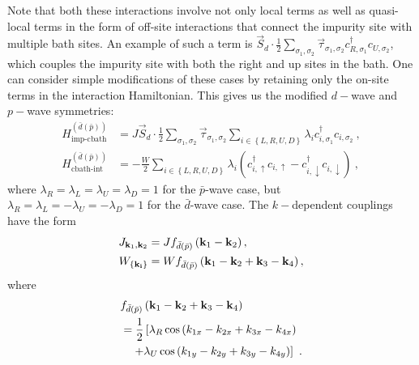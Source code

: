 \documentclass[reprint,hidelinks,onecolumn]{revtex4-2}
\begin{document}
Note that both these interactions involve not only local terms as well as quasi-local terms in the form of off-site interactions that connect the impurity site with multiple bath sites. An example of such a term is \(\vec{S}_d\cdot\frac{1}{2}\sum_{\sigma_1,\sigma_2}\vec{\tau}_{\sigma_1,\sigma_2} c^\dagger_{R,\sigma_1}c_{U,\sigma_2}\), which couples the impurity site with both the right and up sites in the bath. One can consider simple modifications of these cases by retaining only the on-site terms in the interaction Hamiltonian. This gives us the modified \(d-\)wave and \(p-\)wave symmetries:
\begin{equation}\begin{aligned}
	H^{(\bar d(\bar p))}_\text{imp-cbath} &= J\vec{S}_d\cdot\frac{1}{2}\sum_{\sigma_1,\sigma_2}\vec{\tau}_{\sigma_1,\sigma_2} \sum_{i \in \left\{L,R,U,D\right\}} \lambda_i c^\dagger_{i,\sigma_1}c_{i,\sigma_2}~,\\
	H^{(\bar d(\bar p))}_\text{cbath-int} &= -\frac{W}{2}\sum_{i \in \left\{L,R,U,D\right\}} \lambda_i \left(c^\dagger_{i, \uparrow}c_{i, \uparrow} - c^\dagger_{i, \downarrow}c_{i, \downarrow}\right) ~,
\end{aligned}\end{equation}
where \(\lambda_R = \lambda_L = \lambda_U = \lambda_D = 1\) for the \(\bar p\)-wave case, but \(\lambda_R = \lambda_L = -\lambda_U = -\lambda_D = 1\) for the \(\bar d\)-wave case. The \(k-\)dependent couplings have the form
\begin{equation}\begin{aligned}
	J_{{\bf k}_1, {\bf k}_2} &= J f_{\bar d(\bar p)}\left({\bf k}_1 -{\bf k}_2\right),\\
	W_{\left\{ \bf k_i \right\} } &= Wf_{\bar d(\bar p)}\left({\bf k}_1 -{\bf k}_2 + {\bf k}_3 -{\bf k}_4\right) ,
\end{aligned}\end{equation}
where 
\begin{equation}\begin{aligned}
	&f_{\bar d(\bar p)}\left({\bf k}_1 -{\bf k}_2 + {\bf k}_3 -{\bf k}_4\right) \\
	&= \frac{1}{2}\left[\lambda_R \cos\left(k_{1x} - k_{2x} + k_{3x} - k_{4x}\right) \right.\\
	&\quad\left. + \lambda_U \cos\left(k_{1y} - k_{2y} + k_{3y} - k_{4y}\right)\right] ~.
\end{aligned}\end{equation}
\end{document}
